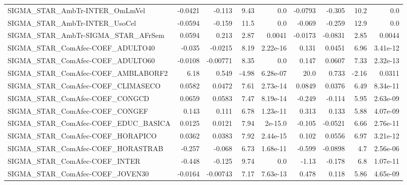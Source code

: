 \begin{tabular}{lrrrrrrrr}
SIGMA\_STAR\_AmbTr-INTER\_OmLmVel        &     -0.0421 &       -0.113 &     9.43 &      0.0 &    -0.0793 &      -0.305 &         10.2 &           0.0 \\
SIGMA\_STAR\_AmbTr-INTER\_UsoCel         &     -0.0594 &       -0.159 &     11.5 &      0.0 &     -0.069 &      -0.259 &         12.9 &           0.0 \\
SIGMA\_STAR\_AmbTr-SIGMA\_STAR\_AFrSem    &      0.0594 &        0.213 &     2.87 &   0.0041 &    -0.0173 &     -0.0831 &         2.85 &        0.0044 \\
SIGMA\_STAR\_ComAfec-COEF\_ADULTO40      &      -0.035 &      -0.0215 &     8.19 & 2.22e-16 &      0.131 &      0.0451 &         6.96 &      3.41e-12 \\
SIGMA\_STAR\_ComAfec-COEF\_ADULTO60      &     -0.0108 &     -0.00771 &     8.35 &      0.0 &      0.147 &      0.0607 &         7.33 &      2.32e-13 \\
SIGMA\_STAR\_ComAfec-COEF\_AMBLABORF2    &        6.18 &        0.549 &    -4.98 & 6.28e-07 &       20.0 &       0.733 &        -2.16 &        0.0311 \\
SIGMA\_STAR\_ComAfec-COEF\_CLIMASECO     &      0.0582 &       0.0472 &     7.61 & 2.73e-14 &     0.0849 &      0.0376 &         6.49 &      8.34e-11 \\
SIGMA\_STAR\_ComAfec-COEF\_CONGCD        &      0.0659 &       0.0583 &     7.47 & 8.19e-14 &     -0.249 &      -0.114 &         5.95 &      2.63e-09 \\
SIGMA\_STAR\_ComAfec-COEF\_CONGEF        &       0.143 &        0.111 &     6.78 & 1.23e-11 &      0.313 &       0.133 &         5.88 &      4.07e-09 \\
SIGMA\_STAR\_ComAfec-COEF\_EDUC\_BASICA   &      0.0125 &       0.0121 &     7.94 &  2e-15.0 &     -0.105 &     -0.0521 &         6.66 &      2.76e-11 \\
SIGMA\_STAR\_ComAfec-COEF\_HORAPICO      &      0.0362 &       0.0383 &     7.92 & 2.44e-15 &      0.102 &      0.0556 &         6.97 &      3.21e-12 \\
SIGMA\_STAR\_ComAfec-COEF\_HORASTRAB     &      -0.257 &       -0.068 &     6.73 & 1.68e-11 &     -0.599 &     -0.0898 &          4.7 &      2.56e-06 \\
SIGMA\_STAR\_ComAfec-COEF\_INTER         &      -0.448 &       -0.125 &     9.74 &      0.0 &      -1.13 &      -0.178 &          6.8 &      1.07e-11 \\
SIGMA\_STAR\_ComAfec-COEF\_JOVEN30       &     -0.0164 &     -0.00743 &     7.17 & 7.63e-13 &      0.478 &       0.118 &         5.86 &      4.65e-09 \\

\end{tabular}
